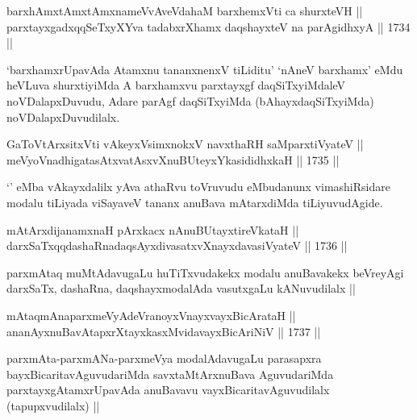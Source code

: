 
\begin{shl}
barxhAmxtAmx\s \s tAmxnameVvAveVdahaM barxhemxVti ca shurxteVH || \\
parxtayxgadxqqSeTxyXYva tadabxrXhamx daqshayxteV na parAgidhxyA ||  1734 ||  
\end{shl}

\begin{artha}
`barxhamxrUpavAda Atamxnu tananxnenxV tiLiditu' `nAneV barxhamx' eMdu
  heVLuva shurxtiyiMda A barxhamxvu parxtayxgf daqSiTxyiMdaleV
  noVDalapxDuvudu, Adare parAgf daqSiTxyiMda (bAhayxdaqSiTxyiMda)
  noVDalapxDuvudilalx.
\end{artha}


\begin{shl}
GaToV\s tArxsitxVti vAkeyxV\s simxnokxV navxthaRH saMparxtiVyateV ||  \\
meVyoV\s nadhigatasAtxvatAsxvXnuBUteyxYkasididhxkaH ||  1735 ||  
\end{shl}

\begin{artha}
`\stext' eMba vAkayxdalilx yAva athaRvu toVruvudu eMbudanunx
  vimashiRsidare modalu tiLiyada viSayaveV tananx anuBava mAtarxdiMda
  tiLiyuvudAgide.
\end{artha}

\begin{shl}
mAtArxdijanamxnaH pArxkacx nAnuBUtayxtireVkataH || \\
darxSaTxqqdashaRnadaqsAyxdivasatxvXnayxdavasiVyateV ||  1736 || 
\end{shl}

\begin{artha}
parxmAtaq muMtAdavugaLu huTiTxvudakekx modalu anuBavakekx beVreyAgi
darxSaTx, dashaRna, daqshayxmodalAda vasutxgaLu kANuvudilalx ||
\end{artha}

\begin{shl}
mAtaqmAnaparxmeVyAdeVranoyxVnayxvayxBicArataH ||  \\
ananAyxnuBavAtapxrXtayxkasxMvidavayxBicAriNiV ||  1737 ||  
\end{shl}

\begin{artha}
parxmAta-parxmANa-parxmeVya modalAdavugaLu parasapxra
bayxBicaritavAguvudariMda savxtaMtArxnuBava AguvudariMda
parxtayxgAtamxrUpavAda anuBavavu vayxBicaritavAguvudilalx
(tapupxvudilalx) ||
\end{artha}

